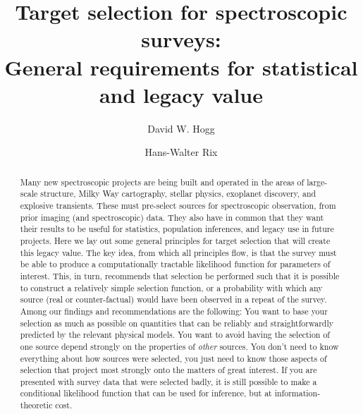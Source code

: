 \documentclass[modern]{aastex62}
\begin{document}
\sloppy\sloppypar\raggedbottom\frenchspacing %

\title{\textbf{%
Target selection for spectroscopic surveys:\\
General requirements for statistical and legacy value%
}}

\author[0000-0003-2866-9403]{David W. Hogg}

\author[0000-0003-4996-9069]{Hans-Walter Rix}

\begin{abstract}\noindent
Many new spectroscopic projects are being built and operated
in the areas of
large-scale structure, Milky Way cartography, stellar physics,
exoplanet discovery, and explosive transients.
These must pre-select sources
for spectroscopic observation, from prior imaging (and spectroscopic)
data.
They also have in common that they want their results to be useful for
statistics, population inferences, and legacy use in future projects.
Here we lay out some general principles for target selection that will
create this legacy value.
The key idea, from which all principles flow, is that the survey must
be able to produce a computationally tractable
likelihood function for parameters of interest.
This, in turn, recommends that selection be performed such that it is possible
to construct a relatively simple selection function, or a probability
with which any source (real or counter-factual) would have been observed
in a repeat of the survey.
Among our findings and recommendations are the following:
You want to base your selection as much as possible on quantities that
can be reliably and straightforwardly predicted by the relevant
physical models.
You want to avoid having the selection of one source
depend strongly on the properties of \emph{other} sources.
You don't need to know everything about how sources were selected, you
just need to know those aspects of selection that project most strongly
onto the matters of great interest.
If you are presented with survey data that were selected badly,
it is still possible to make a conditional likelihood function that can be
used for inference, but at information-theoretic cost.
\end{abstract}
\end{document}
